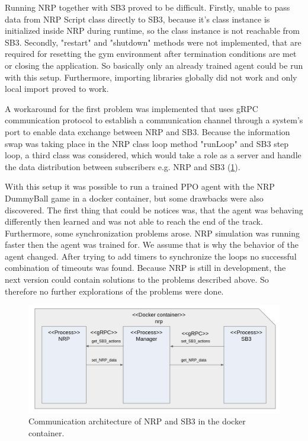 \documentclass[conference]{IEEEtran}
\begin{document}
Running NRP together with SB3 proved to be difficult. Firstly, unable to pass data from NRP Script class directly to SB3, because it's class instance is initialized inside NRP during runtime, so the class instance is not reachable from SB3. Secondly, "restart" and "shutdown" methods were not implemented, that are required for resetting the gym environment after termination conditions are met or closing the application. So basically only an already trained agent could be run with this setup. Furthermore, importing libraries globally did not work and only local import proved to work. 

A workaround for the first problem was implemented that uses gRPC communication protocol to establish a communication channel through a system's port to enable data exchange between NRP and SB3. Because the information swap was taking place in the NRP class loop method "runLoop" and SB3 step loop, a third class was considered, which would take a role as a server and handle the data distribution between subscribers e.g. NRP and SB3 (\figurename  \ref{fig:NRP_docker}).

With this setup it was possible to run a trained PPO agent with the NRP DummyBall game in a docker container, but some drawbacks were also discovered. The first thing that could be notices was, that the agent was behaving differently then learned and was not able to reach the end of the track. Furthermore, some synchronization problems arose. NRP simulation was running faster then the agent was trained for. We assume that is why the behavior of the agent changed. After trying to add timers to synchronize the loops no successful combination of timeouts was found. Because NRP is still in development, the next version could contain solutions to the problems described above. So therefore no further explorations of the problems were done.

\begin{figure}[!t]
  \centering
  \includegraphics[width=1.0\linewidth]{images/NRP_docker.png}
  \caption{Communication architecture of NRP and SB3 in the docker container.}
\label{fig:NRP_docker}
\end{figure}
\end{document}
